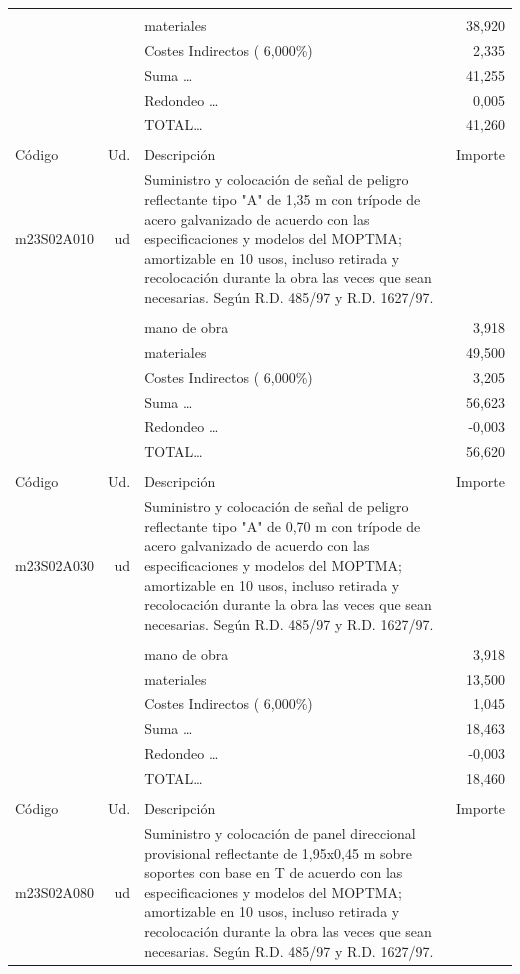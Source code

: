 \documentclass{book}%
\begin{document}
\begin{supertabular}{l r p{60mm} r}
&&&\\%
&&materiales&    38,920\\%
&&Costes Indirectos (     6,000\%)&     2,335\\%
&&Suma \ldots&    41,255\\%
&&Redondeo \ldots&     0,005\\%
%
&&TOTAL\ldots&    41,260\\%
&&&\\%
Código&Ud.&Descripción&Importe\\%
\hline%
m23S02A010&ud&Suministro y colocación de señal de peligro reflectante tipo "A" de 1,35 m con trípode de acero galvanizado de acuerdo con las especificaciones y modelos del MOPTMA; amortizable en 10 usos, incluso retirada y recolocación durante la obra las veces que sean necesarias. Según R.D. 485/97 y R.D. 1627/97.&\\%
&&&\\%
&&mano de obra&     3,918\\%
&&materiales&    49,500\\%
&&Costes Indirectos (     6,000\%)&     3,205\\%
&&Suma \ldots&    56,623\\%
&&Redondeo \ldots&    {-}0,003\\%
%
&&TOTAL\ldots&    56,620\\%
&&&\\%
Código&Ud.&Descripción&Importe\\%
\hline%
m23S02A030&ud&Suministro y colocación de señal de peligro reflectante tipo "A" de 0,70 m con trípode de acero galvanizado de acuerdo con las especificaciones y modelos del MOPTMA; amortizable en 10 usos, incluso retirada y recolocación durante la obra las veces que sean necesarias. Según R.D. 485/97 y R.D. 1627/97.&\\%
&&&\\%
&&mano de obra&     3,918\\%
&&materiales&    13,500\\%
&&Costes Indirectos (     6,000\%)&     1,045\\%
&&Suma \ldots&    18,463\\%
&&Redondeo \ldots&    {-}0,003\\%
%
&&TOTAL\ldots&    18,460\\%
&&&\\%
Código&Ud.&Descripción&Importe\\%
\hline%
m23S02A080&ud&Suministro y colocación de panel direccional provisional reflectante de 1,95x0,45 m sobre soportes con base en T de acuerdo con las especificaciones y modelos del MOPTMA; amortizable en 10 usos, incluso retirada y recolocación durante la obra las veces que sean necesarias. Según R.D. 485/97 y R.D. 1627/97.&\\%

\end{supertabular}
\end{document}
